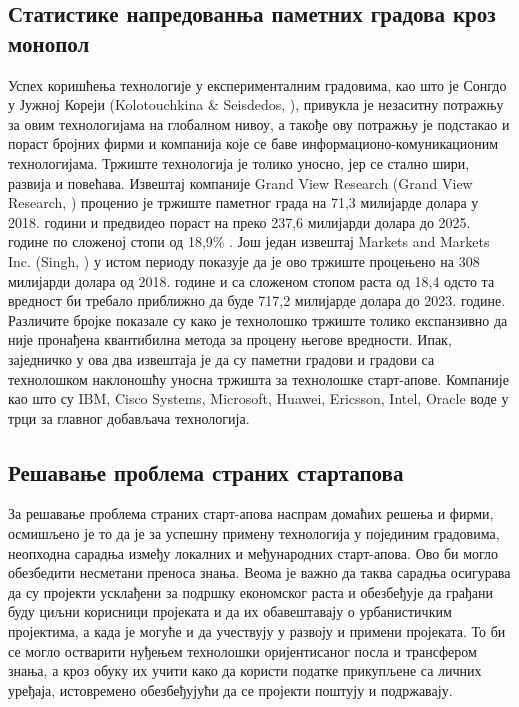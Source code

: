 \documentclass{article}
\begin{document}
\subsection{Статистике напредованња паметних градова кроз монопол}
Успех коришћења технологије у експерименталним градовима, као што је Сонгдо у Јужној Кореји (Kolotouchkina & Seisdedos, \cite{2017}), привукла је незаситну потражњу за овим технологијама на глобалном нивоу, а такође ову потражњу је подстакао и пораст бројних фирми и компанија које се баве информационо-комуникационим технологијама. Тржиште технологија је толико уносно,  јер се стално шири, развија и повећава. Извештај компаније Grand View Research (Grand View Research, \cite{2019}) проценио је тржиште паметног града на 71,3 милијарде долара у 2018. години и предвидео пораст на преко 237,6 милијарди долара до 2025. године по сложеној стопи од 18,9\% . Још један извештај Markets and Markets Inc. (Singh, \cite{s2019}) у истом периоду показује да је ово тржиште процењено на 308 милијарди долара од 2018. године и са сложеном стопом раста од 18,4 одсто та вредност би требало приближно да буде 717,2 милијарде долара до 2023. године. Различите бројке показале су како је технолошко тржиште толико експанзивно да није пронађена квантибилна метода за процену његове вредности. Ипак, заједничко у ова два извештаја је да су паметни градови и градови са технолошком наклоношћу уносна тржишта за технолошке старт-апове. Компаније као што су IBM, Cisco Systems, Microsoft, Huawei, Ericsson, Intel, Oracle воде у трци за главног добављача технологија. 

\subsection{Решавање проблема страних стартапова}
За решавање проблема страних старт-апова наспрам домаћих решења и фирми, осмишљено је то да је за успешну примену технологија у појединим градовима, неопходна сарадња између локалних и међународних старт-апова. Ово би могло обезбедити несметани преноса знања. Веома је важно да таква сарадња осигурава да су пројекти усклађени за подршку економског раста и обезбеђује да грађани буду циљни корисници пројеката и да их обавештавају о урбанистичким пројектима, а када је могуће и да учествују у развоју и примени пројеката. То би се могло остварити нуђењем технолошки оријентисаног посла и трансфером знања, а кроз обуку их учити како да користи податке прикупљене са личних уређаја, истовремено обезбеђујући да се пројекти поштују и подржавају.
\end{document}
